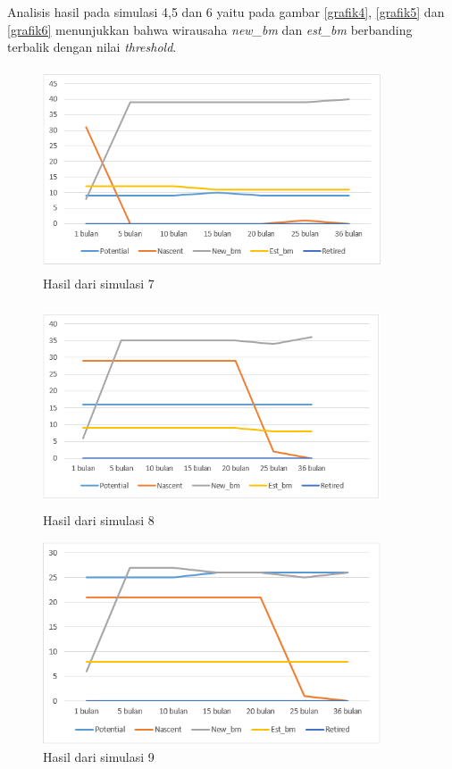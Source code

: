 Analisis hasil pada simulasi 4,5 dan 6 yaitu pada gambar \ref{grafik4}, \ref{grafik5} dan \ref{grafik6} menunjukkan bahwa wirausaha \textit{new\_bm} dan \textit{est\_bm} berbanding terbalik dengan nilai \textit{threshold}.

	\begin{figure} [H]
	\centering  
	\includegraphics[width=10cm, height=6cm]{grafik7} 
		\caption[Hasil dari simulasi 7]{Hasil dari simulasi 7}
	\label{grafik7} 
\end{figure}

	\begin{figure} [H]
	\centering  
	\includegraphics[width=10cm, height=6cm]{grafik8} 
		\caption[Hasil dari simulasi 8]{Hasil dari simulasi 8}
	\label{grafik8} 
\end{figure}

	\begin{figure} [H]
	\centering  
	\includegraphics[width=10cm, height=6cm]{grafik9} 
		\caption[Hasil dari simulasi 9]{Hasil dari simulasi 9}
	\label{grafik9} 
\end{figure}

